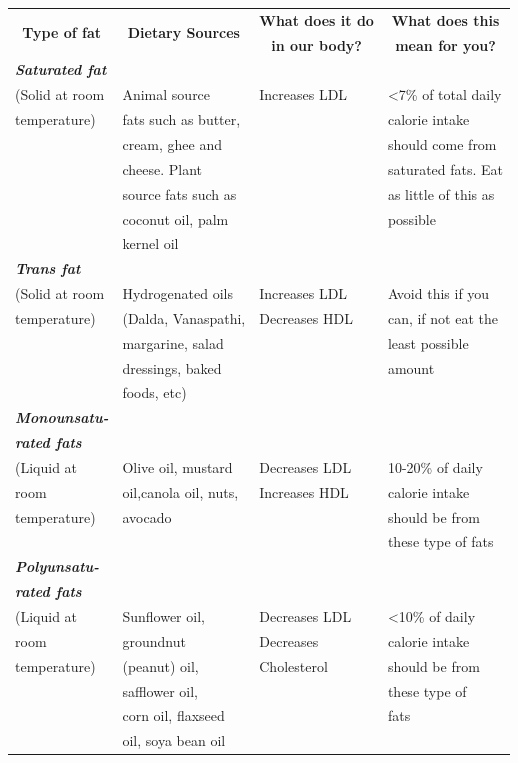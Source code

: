 {
\addtolength{\tabcolsep}{-6pt}
\begin{longtable}{|l|l|l|l|}
\hline
\multicolumn{1}{|c|}{\multirow{2}{2.3cm}{\textbf{Type of fat}}} & \multicolumn{1}{c|}{\multirow{2}{3.1cm}{\textbf{Dietary Sources}}} & \textbf{What does it do} & \multicolumn{1}{|c|}{\textbf{What does this}}\\
 &  & \multicolumn{1}{|c|}{\textbf{in our body?}} & \multicolumn{1}{|c|}{\textbf{mean for you?}}\\
\hline
\textbf{\textit{Saturated fat\index{Saturated fat}}} &  &  & \\
(Solid at room & Animal source & Increases LDL & \textless 7\% of total daily\\
temperature) & fats such as butter, &  & calorie intake\\
 & cream, ghee and &  & should come from\\
 & cheese. Plant &  & saturated fats. Eat\\
 & source fats such as &  & as little of this as\\
 & coconut oil, palm &  & possible\\
 & kernel oil &  & \\
\hline
\textbf{\textit{Trans fat\index{Transfat}}} &  &  & \\
(Solid at room & Hydrogenated oils & Increases LDL & Avoid this if you\\
temperature) & (Dalda, Vanaspathi, & Decreases HDL & can, if not eat the\\
 & margarine, salad &  & least possible\\
 & dressings, baked &  & amount\\
 & foods, etc) &  & \\
\hline
\textbf{\textit{Monounsatu-}} &  &  & \\
\textbf{\textit{rated fats\index{Monounsaturated fats}}} &  &  & \\
(Liquid at & Olive oil, mustard & Decreases LDL & 10-20\% of daily\\
room & oil,canola oil, nuts, & Increases HDL & calorie intake\\
temperature) & avocado &  & should be from\\
 &  &  & these type of fats\\
\hline
\textbf{\textit{Polyunsatu-}} &  &  & \\
\textbf{\textit{rated fats}} &  &  & \\
(Liquid at & Sunflower oil, & Decreases LDL & \textless 10\% of daily\\
room & groundnut & Decreases & calorie intake\\
temperature) & (peanut) oil, & Cholesterol & should be from\\
 & safflower oil, &  & these type of\\
 & corn oil, flaxseed &  & fats\\
 & oil, soya bean oil &  & \\
\hline
\end{longtable}
}\relax

